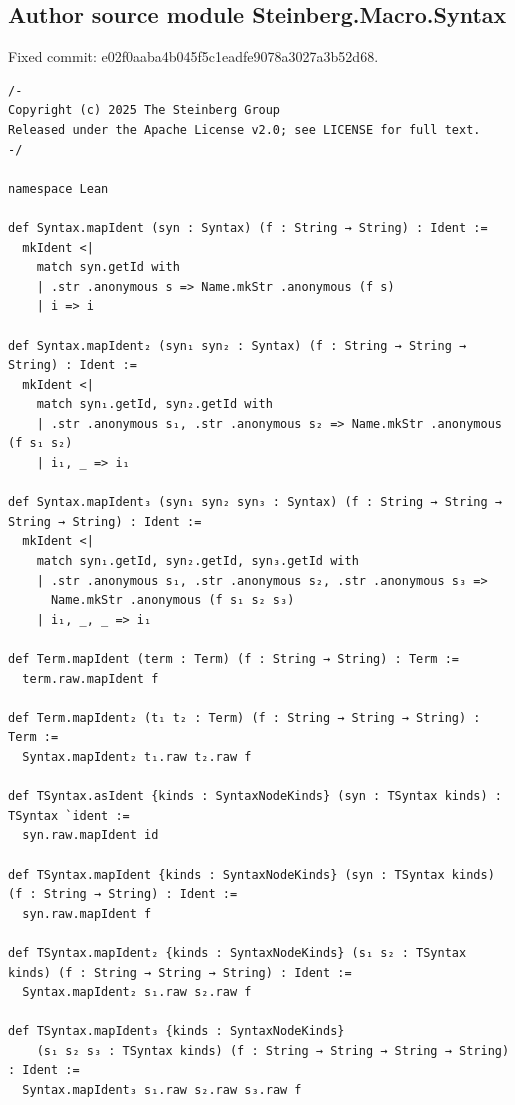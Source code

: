 \subsection*{Author source module Steinberg.Macro.Syntax}
\noindent Fixed commit: e02f0aaba4b045f5c1eadfe9078a3027a3b52d68.
\begin{Verbatim}
/-
Copyright (c) 2025 The Steinberg Group
Released under the Apache License v2.0; see LICENSE for full text.
-/

namespace Lean

def Syntax.mapIdent (syn : Syntax) (f : String → String) : Ident :=
  mkIdent <|
    match syn.getId with
    | .str .anonymous s => Name.mkStr .anonymous (f s)
    | i => i

def Syntax.mapIdent₂ (syn₁ syn₂ : Syntax) (f : String → String → String) : Ident :=
  mkIdent <|
    match syn₁.getId, syn₂.getId with
    | .str .anonymous s₁, .str .anonymous s₂ => Name.mkStr .anonymous (f s₁ s₂)
    | i₁, _ => i₁

def Syntax.mapIdent₃ (syn₁ syn₂ syn₃ : Syntax) (f : String → String → String → String) : Ident :=
  mkIdent <|
    match syn₁.getId, syn₂.getId, syn₃.getId with
    | .str .anonymous s₁, .str .anonymous s₂, .str .anonymous s₃ =>
      Name.mkStr .anonymous (f s₁ s₂ s₃)
    | i₁, _, _ => i₁

def Term.mapIdent (term : Term) (f : String → String) : Term :=
  term.raw.mapIdent f

def Term.mapIdent₂ (t₁ t₂ : Term) (f : String → String → String) : Term :=
  Syntax.mapIdent₂ t₁.raw t₂.raw f

def TSyntax.asIdent {kinds : SyntaxNodeKinds} (syn : TSyntax kinds) : TSyntax `ident :=
  syn.raw.mapIdent id

def TSyntax.mapIdent {kinds : SyntaxNodeKinds} (syn : TSyntax kinds) (f : String → String) : Ident :=
  syn.raw.mapIdent f

def TSyntax.mapIdent₂ {kinds : SyntaxNodeKinds} (s₁ s₂ : TSyntax kinds) (f : String → String → String) : Ident :=
  Syntax.mapIdent₂ s₁.raw s₂.raw f

def TSyntax.mapIdent₃ {kinds : SyntaxNodeKinds}
    (s₁ s₂ s₃ : TSyntax kinds) (f : String → String → String → String) : Ident :=
  Syntax.mapIdent₃ s₁.raw s₂.raw s₃.raw f
\end{Verbatim}
